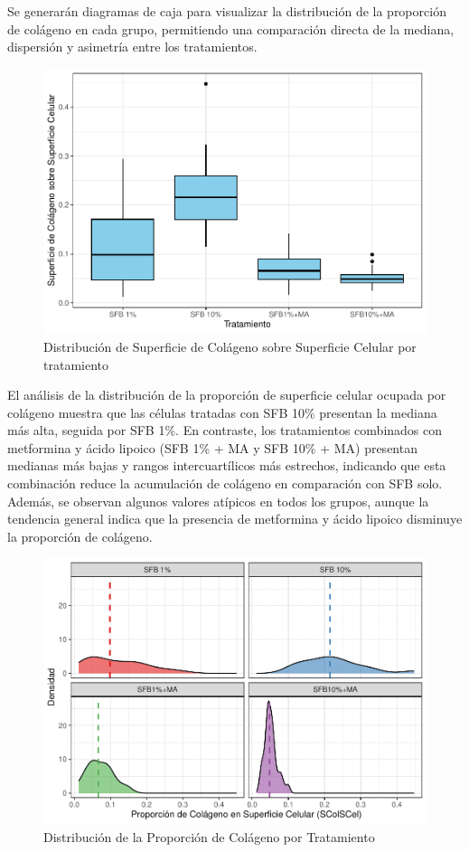 \documentclass[
  10pt,
]{article}
\begin{document}
Se generarán diagramas de caja para visualizar la distribución de la
proporción de colágeno en cada grupo, permitiendo una comparación
directa de la mediana, dispersión y asimetría entre los tratamientos.

\begin{figure}

{\centering \includegraphics[width=0.55\linewidth,height=0.35\textheight]{Trabajo-Practico-NP_files/figure-latex/unnamed-chunk-4-1} 

}

\caption{Distribución de Superficie de Colágeno sobre Superficie Celular por tratamiento}\label{fig:unnamed-chunk-4}
\end{figure}

El análisis de la distribución de la proporción de superficie celular
ocupada por colágeno muestra que las células tratadas con SFB 10\%
presentan la mediana más alta, seguida por SFB 1\%. En contraste, los
tratamientos combinados con metformina y ácido lipoico (SFB 1\% + MA y
SFB 10\% + MA) presentan medianas más bajas y rangos intercuartílicos
más estrechos, indicando que esta combinación reduce la acumulación de
colágeno en comparación con SFB solo. Además, se observan algunos
valores atípicos en todos los grupos, aunque la tendencia general indica
que la presencia de metformina y ácido lipoico disminuye la proporción
de colágeno.

\newpage

\begin{figure}

{\centering \includegraphics[width=0.55\linewidth,height=0.35\textheight]{Trabajo-Practico-NP_files/figure-latex/fig2-1} 

}

\caption{Distribución de la Proporción de Colágeno por Tratamiento}\label{fig:fig2}
\end{figure}
\end{document}
